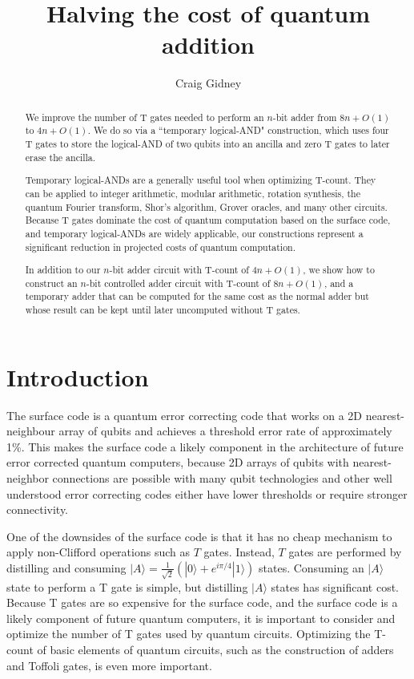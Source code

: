 \documentclass{quantumarticle-customized}
\title{Halving the cost of quantum addition}
\author{Craig Gidney}
\affiliation{Google, Santa Barbara, CA 93117, USA}
\begin{document}
\maketitle

\begin{abstract}
We improve the number of T gates needed to perform an $n$-bit adder from $8n + O(1)$ \citep{Amy2013, Cuccaro2004, AustinDiscussionsAndEmails2017} to $4n + O(1)$.
We do so via a ``temporary logical-AND" construction, which uses four T gates to store the logical-AND of two qubits into an ancilla and zero T gates to later erase the ancilla.

Temporary logical-ANDs are a generally useful tool when optimizing T-count.
They can be applied to integer arithmetic, modular arithmetic, rotation synthesis, the quantum Fourier transform, Shor's algorithm, Grover oracles, and many other circuits.
Because T gates dominate the cost of quantum computation based on the surface code, and temporary logical-ANDs are widely applicable, our constructions represent a significant reduction in projected costs of quantum computation.

In addition to our $n$-bit adder circuit with T-count of $4n + O(1)$, we show how to construct an $n$-bit controlled adder circuit with T-count of $8n + O(1)$, and a temporary adder that can be computed for the same cost as the normal adder but whose result can be kept until later uncomputed without T gates.
\end{abstract}


\section{Introduction}
\label{sec:introduction}

The surface code \citep{Brav98,Denn02,Raus07,Raus07d,Fowler2012} is a quantum error correcting code that works on a 2D nearest-neighbour array of qubits and achieves a threshold error rate of approximately 1\%.
This makes the surface code a likely component in the architecture of future error corrected quantum computers, because 2D arrays of qubits with nearest-neighbor connections are possible with many qubit technologies \citep{Schl11,Bare13,Gamb17,Leik17,Laht17} and other well understood error correcting codes either have lower thresholds or require stronger connectivity.

One of the downsides of the surface code is that it has no cheap mechanism to apply non-Clifford operations such as $T$ gates.
Instead, $T$ gates are performed by distilling and consuming $|A\rangle = \frac{1}{\sqrt{2}} (|0\rangle + e^{i \pi/4} |1\rangle)$ states.
Consuming an $|A\rangle$ state to perform a T gate is simple, but distilling $|A\rangle$ states has significant cost.
Because T gates are so expensive for the surface code, and the surface code is a likely component of future quantum computers, it is important to consider and optimize the number of T gates used by quantum circuits.
Optimizing the T-count of basic elements of quantum circuits, such as the construction of adders and Toffoli gates, is even more important.
\end{document}
